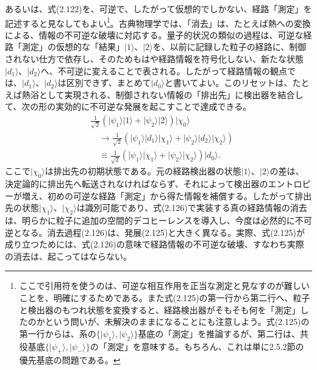 \hypertarget{srcpage:101}{}\label{srcpage:101}
あるいは、式(2.122)を、可逆で、したがって仮想的でしかない、経路「測定」を記述すると見なしてもよい\footnote{ここで引用符を使うのは、可逆な相互作用を正当な測定と見なすのが難しいことを、明確にするためである。また式(2.125)の第一行から第二行へ、粒子と検出器のもつれ状態を変換すると、経路検出器がそもそも何を「測定」したのかという問いが、未解決のままになることにも注意しよう。式(2.125)の第一行からは、系の$\{\lvert\psi_1\rangle,\lvert\psi_2\rangle\}$基底の「測定」を推論するが、第二行は、共役基底$\{\lvert\psi_+\rangle,\lvert\psi_-\rangle\}$の「測定」を意味する。もちろん、これは単に2.5.2節の優先基底の問題である。}。古典物理学では、「消去」は、たとえば熱への変換による、情報の不可逆な破壊に対応する\cite{ref136}。量子的状況の類似の過程は、可逆な経路「測定」の仮想的な「結果」$\lvert1\rangle$、$\lvert2\rangle$を、以前に記録した粒子の経路に、制御されない仕方で依存し、そのためもはや経路情報を符号化しない、新たな状態$\lvert d_1\rangle$、$\lvert d_2\rangle$へ、不可逆に変えることで表される。したがって経路情報の観点では、$\lvert d_1\rangle$、$\lvert d_2\rangle$は区別できず、まとめて$\lvert d_0\rangle$と書いてよい。このリセット\cite{ref136,ref137}は、たとえば熱浴として実現される、制御されない情報の「排出先」に検出器を結合して、次の形の実効的に不可逆な発展を起こすことで達成できる。
\begin{equation}\begin{split}
&\frac1{\sqrt2}(\lvert\psi_1\rangle\lvert1\rangle+\lvert\psi_2\rangle\lvert2\rangle)\lvert\chi_0\rangle\\
&\quad\longrightarrow\frac1{\sqrt2}(\lvert\psi_1\rangle\lvert d_1\rangle\lvert\chi_1\rangle+\lvert\psi_2\rangle\lvert d_2\rangle\lvert\chi_2\rangle)\\
&\quad\equiv\frac1{\sqrt2}(\lvert\psi_1\rangle\lvert\chi_1\rangle+\lvert\psi_2\rangle\lvert\chi_2\rangle)\lvert d_0\rangle.
\end{split}\tag{2.126}\end{equation}
ここで$\lvert\chi_0\rangle$は排出先の初期状態である。元の経路検出器の状態$\lvert1\rangle$、$\lvert2\rangle$の差は、決定論的に排出先へ転送されなければならず、それによって検出器のエントロピーが増え、初めの可逆な経路「測定」から得た情報を補償する。したがって排出先の状態$\lvert\chi_1\rangle$、$\lvert\chi_2\rangle$は識別可能であり、式(2.126)で実装する真の経路情報の消去は、明らかに粒子に追加の空間的デコヒーレンスを導入し、今度は必然的に不可逆となる。消去過程(2.126)は、発展(2.125)と大きく異なる。実際、式(2.125)が成り立つためには、式(2.126)の意味で経路情報の不可逆な破壊、すなわち実際の消去は、起こってはならない。
